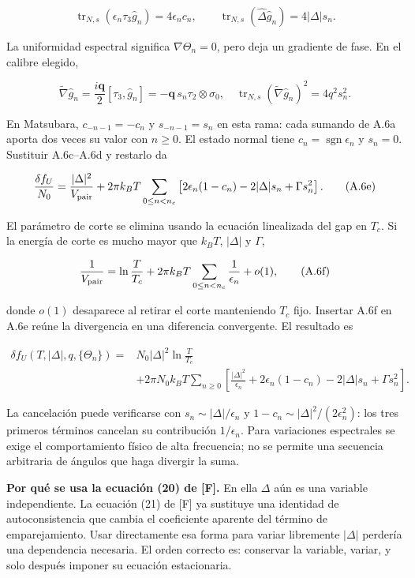 \documentclass[
  spanish,
  10pt,
  a4paper,
]{article}
\begin{document}
\[
\operatorname{tr}_{N,s}(\epsilon_n\tau_3\hat g_n)=4\epsilon_nc_n,
\qquad
\operatorname{tr}_{N,s}(\hat\Delta\hat g_n)=4|\Delta|s_n.
\tag{A.6c}
\]

La uniformidad espectral significa \(\nabla\Theta_n=0\), pero deja un
gradiente de fase. En el calibre elegido,

\[
\widetilde\nabla\hat g_n
=\frac{i\mathbf q}{2}[\tau_3,\hat g_n]
=-\mathbf q\,s_n\tau_2\otimes\sigma_0,
\quad
\operatorname{tr}_{N,s}(\widetilde\nabla\hat g_n)^2
=4q^2s_n^2.
\tag{A.6d}
\]

En Matsubara, \(c_{-n-1}=-c_n\) y \(s_{-n-1}=s_n\) en esta rama: cada
sumando de A.6a aporta dos veces su valor con \(n\geq0\). El estado
normal tiene \(c_n=\operatorname{sgn}\epsilon_n\) y \(s_n=0\). Sustituir
A.6c--A.6d y restarlo da

\[
\frac{\delta f_U}{N_0}
=\frac{|\Delta|^2}{V_{\rm pair}}
+2\pi k_BT\sum_{0\leq n<n_c}
\left[2\epsilon_n(1-c_n)-2|\Delta|s_n+\Gamma s_n^2\right].
\tag{A.6e}
\]

El parámetro de corte se elimina usando la ecuación linealizada del gap
en \(T_c\). Si la energía de corte es mucho mayor que \(k_BT\),
\(|\Delta|\) y \(\Gamma\),

\[
\frac{1}{V_{\rm pair}}
=\ln\frac{T}{T_c}
+2\pi k_BT\sum_{0\leq n<n_c}\frac{1}{\epsilon_n}
+o(1),
\tag{A.6f}
\]

donde \(o(1)\) desaparece al retirar el corte manteniendo \(T_c\) fijo.
Insertar A.6f en A.6e reúne la divergencia en una diferencia
convergente. El resultado es

\[
\begin{aligned}
\delta f_U(T,|\Delta|,q,\{\Theta_n\})
={}&N_0|\Delta|^2\ln\frac{T}{T_c}\\
&+2\pi N_0k_BT\sum_{n\geq0}
\left[\frac{|\Delta|^2}{\epsilon_n}
+2\epsilon_n(1-c_n)-2|\Delta|s_n+\Gamma s_n^2\right].
\end{aligned}
\tag{A.6}
\]

La cancelación puede verificarse con \(s_n\sim|\Delta|/\epsilon_n\) y
\(1-c_n\sim|\Delta|^2/(2\epsilon_n^2)\): los tres primeros términos
cancelan su contribución \(1/\epsilon_n\). Para variaciones espectrales
se exige el comportamiento físico de alta frecuencia; no se permite una
secuencia arbitraria de ángulos que haga divergir la suma.

\textbf{Por qué se usa la ecuación (20) de {[}F{]}.} En ella \(\Delta\)
aún es una variable independiente. La ecuación (21) de {[}F{]} ya
sustituye una identidad de autoconsistencia que cambia el coeficiente
aparente del término de emparejamiento. Usar directamente esa forma para
variar libremente \(|\Delta|\) perdería una dependencia necesaria. El
orden correcto es: conservar la variable, variar, y solo después imponer
su ecuación estacionaria.
\end{document}

